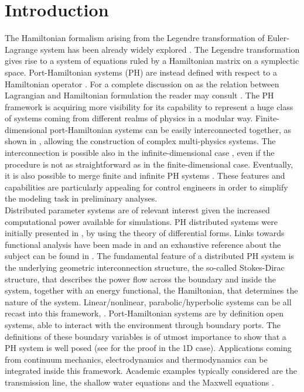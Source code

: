 \documentclass[preprint,12pt]{elsarticle}
\begin{document}
	\section*{Introduction}
	 The Hamiltonian formalism arising from the Legendre transformation of Euler-Lagrange system  has been already widely explored \cite{SymplecticElasticity}. The Legendre transformation gives rise to a system of equations ruled by a Hamiltonian matrix on a symplectic space. Port-Hamiltonian systems (PH) are instead defined with respect to a {Hamiltonian operator \cite[Chapter~7]{Olver}. For a complete discussion on as the relation between Lagrangian and Hamiltonian formulation the reader may consult \cite{MardsenDiraclAG_I, MardsenDiraclAG_II}.} The PH framework is acquiring more visibility for its capability to represent a huge class of systems coming from different realms of physics in a modular way. Finite-dimensional port-Hamiltonian systems can be easily interconnected together, as shown in \cite{Cervera2007}, allowing the construction of complex multi-physics systems. The interconnection is possible also in the infinite-dimensional case \cite{ShaftIntInfinite}, even if the procedure is not as straightforward as in the finite-dimensional case. Eventually, it is also possible to merge finite and infinite PH systems \cite{vanderShaftintFinInf}. These features and capabilities are particularly appealing for control engineers in order to simplify the modeling task in preliminary analyses.  \\
	
	
	Distributed parameter systems are of relevant interest given the increased computational power available for simulations. PH distributed systems were initially presented in \cite{VANDERSCHAFT2002166}, by using the theory of differential forms. Links towards functional analysis have been made in \cite{Villegas} and an exhaustive reference about the subject can be found in \cite{BookZwart}. The fundamental feature of a distributed PH system is the underlying geometric interconnection structure, the so-called Stokes-Dirac structure, that describes the power flow across the boundary and inside the system, together with an energy functional, the Hamiltonian, that determines the nature of the system. Linear/nonlinear, parabolic/hyperbolic systems can be all recast into this framework, \cite{bookPHs}. Port-Hamiltonian systems are by definition open systems, able to interact with the environment through boundary ports. The definitions of these boundary variables is of utmost importance to show that a PH system is well posed (see \cite{LeGorrec2005} for the proof in the 1D case). Applications coming from continuum mechanics, electrodynamics and thermodynamics can be integrated inside this framework. Academic examples typically considered are the transmission line, the shallow water equations and the Maxwell equations \cite{VANDERSCHAFT2002166}. \\
	
\end{document}
